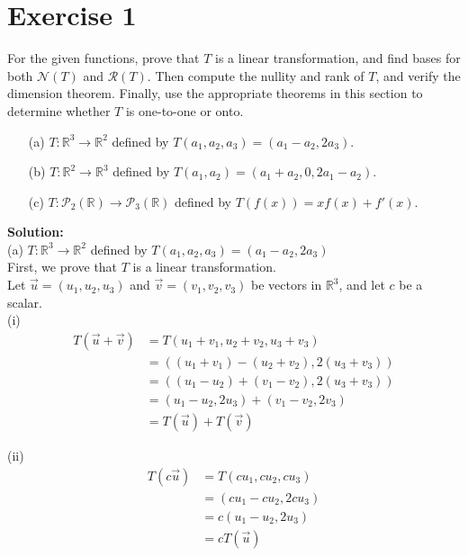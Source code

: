 \documentclass{article}
\begin{document}
\section*{Exercise 1}
For the given functions, prove that $T$ is a linear transformation, and find bases for both $\mathcal{N}(T)$ and $\mathcal{R}(T)$. Then compute the nullity and rank of $T$, and verify the dimension theorem. Finally, use the appropriate theorems in this section to determine whether $T$ is one-to-one or onto.
\begin{itemize}
    \item[(a)] $T : \mathbb{R}^3 \to \mathbb{R}^2$ defined by $T(a_1, a_2, a_3) = (a_1 - a_2, 2a_3)$.

    \item[(b)] $T : \mathbb{R}^2 \to \mathbb{R}^3$ defined by $T(a_1, a_2) = (a_1 + a_2, 0, 2a_1 - a_2)$.

    \item[(c)] $T : \mathcal{P}_2(\mathbb{R}) \to \mathcal{P}_3(\mathbb{R})$ defined by $T(f(x)) = xf(x) + f'(x)$.
\end{itemize}

\textbf{Solution: }\\

(a) $T : \mathbb{R}^3 \to \mathbb{R}^2$ defined by $T(a_1, a_2, a_3) = (a_1 - a_2, 2a_3)$ \\

First, we prove that $T$ is a linear transformation. \\

Let $\vec{u} = (u_1, u_2, u_3)$ and $\vec{v} = (v_1, v_2, v_3)$ be vectors in $\mathbb{R}^3$, and let $c$ be a scalar. \\

(i)
\begin{align*}
    T(\vec{u} + \vec{v}) &= T(u_1 + v_1, u_2 + v_2, u_3 + v_3) \\
    &= ((u_1 + v_1) - (u_2 + v_2), 2(u_3 + v_3)) \\
    &= ((u_1 - u_2) + (v_1 - v_2), 2(u_3 + v_3)) \\
    &= (u_1 - u_2, 2u_3) + (v_1 - v_2, 2v_3) \\
    &= T(\vec{u}) + T(\vec{v})
\end{align*}

(ii)
\begin{align*}
    T(c\vec{u}) &= T(cu_1, cu_2, cu_3) \\
    &= (cu_1 - cu_2, 2cu_3) \\
    &= c(u_1 - u_2, 2u_3) \\
    &= cT(\vec{u})
\end{align*}
\end{document}
